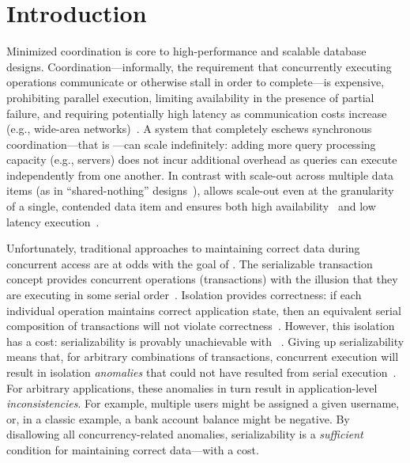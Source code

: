 
\section{Introduction}
\label{sec:intro}


Minimized coordination is core to high-performance and scalable
database designs. Coordination---informally, the requirement that
concurrently executing operations communicate or otherwise stall in
order to complete---is expensive, prohibiting parallel execution,
limiting availability in the presence of partial failure, and
requiring potentially high latency as communication costs increase
(e.g., wide-area networks)~\cite{hat-vldb,gilbert-cap}. A system that
completely eschews synchronous coordination---that is
\textit{\cfree}---can scale indefinitely: adding more query processing
capacity (e.g., servers) does not incur additional overhead as queries
can execute independently from one another. In contrast with scale-out
across multiple data items (as in ``shared-nothing''
designs~\cite{bernstein-book,f1,spanner,pnuts,hstore}), \cfreedom
allows scale-out even at the granularity of a single, contended data
item and ensures both high availability~\cite{gilbert-cap} and low
latency execution~\cite{pacelc}.


Unfortunately, traditional approaches to maintaining correct data
during concurrent access are at odds with the goal of \cfreedom. The
serializable transaction concept provides concurrent operations
(transactions) with the illusion that they are executing in some
serial order~\cite{bernstein-book}. Isolation provides correctness: if
each individual operation maintains correct application state, then an
equivalent serial composition of transactions will not violate
correctness~\cite{gray-virtues}. However, this isolation has a cost:
serializability is provably unachievable with
\cfreedom~\cite{hat-vldb,davidson-survey}. Giving up serializability
means that, for arbitrary combinations of transactions, concurrent
execution will result in isolation \textit{anomalies} that could not
have resulted from serial execution~\cite{adya-isolation}. For
arbitrary applications, these anomalies in turn result in
application-level \textit{inconsistencies}. For example, multiple
users might be assigned a given username, or, in a classic example, a
bank account balance might be negative. By disallowing all
concurrency-related anomalies, serializability is a
\textit{sufficient} condition for maintaining correct data---with a
cost.

